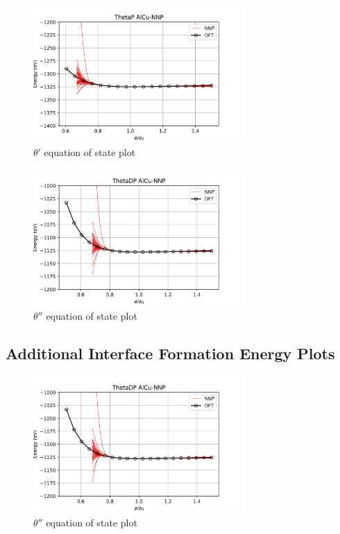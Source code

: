 \documentclass{article}
\begin{document}
\begin{figure}[H]%
\centering%
\includegraphics[width=0.7\textwidth,center]{figures/EOS_AlCu-NNP_ThetaP.png}%
\caption{$\theta'$ equation of state plot}%
\end{figure}

\begin{figure}[H]%
\centering%
\includegraphics[width=0.7\textwidth,center]{figures/EOS_AlCu-NNP_ThetaDP.png}%
\caption{$\theta''$ equation of state plot}%
\end{figure}

\subsection{Additional Interface Formation Energy Plots} \label{sct:add_interface}
\begin{figure}[H]%
\centering%
\includegraphics[width=0.7\textwidth,center]{figures/EOS_AlCu-NNP_ThetaDP.png}%
\caption{$\theta''$ equation of state plot}%
\end{figure}
\end{document}
